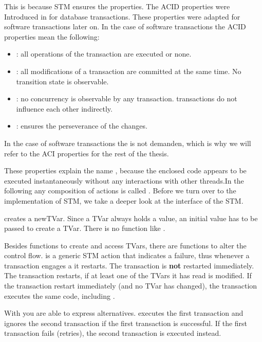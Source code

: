 This is because STM ensures the  properties. The ACID properties were Introduced in \parencite{DBTrans} for
database transactions. These properties were adapted for software transactions later on.
In the case of software transactions the ACID properties mean the following:
\begin{itemize}
 \item {}: all operations of the transaction are executed or none.
 \item {}: all modifications of a transaction are committed at the same time. No transition state is observable.
 \item {}: no concurrency is observable by any transaction. transactions do not influence each other indirectly.
 \item {}: ensures the perseverance of the changes.
\end{itemize}
In the case of software transactions the  is not demanden, which is why we will refer to the ACI properties
for the rest of the thesis.

These properties explain the name , because the enclosed code appears to be executed instantaneously without any 
interactions with other threads.In the following any composition of  actions is called .
Before we turn over to the implementation of STM, we take a deeper look at the interface of the STM.

 creates a newTVar. Since a TVar always holds a value, an initial value has to be
passed to create a TVar. There is no function like . 

Besides functions to create and access TVars, there are functions to alter the control flow.
 is a generic STM action that indicates a failure, thus whenever a transaction engages a  it restarts. The transaction
is \textbf{not} restarted immediately. The transaction restarts, if at least one of the TVars it has read is modified. If the transaction 
restart immediately (and no TVar has changed), the transaction executes the same code, including . 

With  you are able to express alternatives.  executes the first transaction
and ignores the second transaction if the first transaction is successful. If the first transaction fails (retries), the second transaction is 
executed instead.

